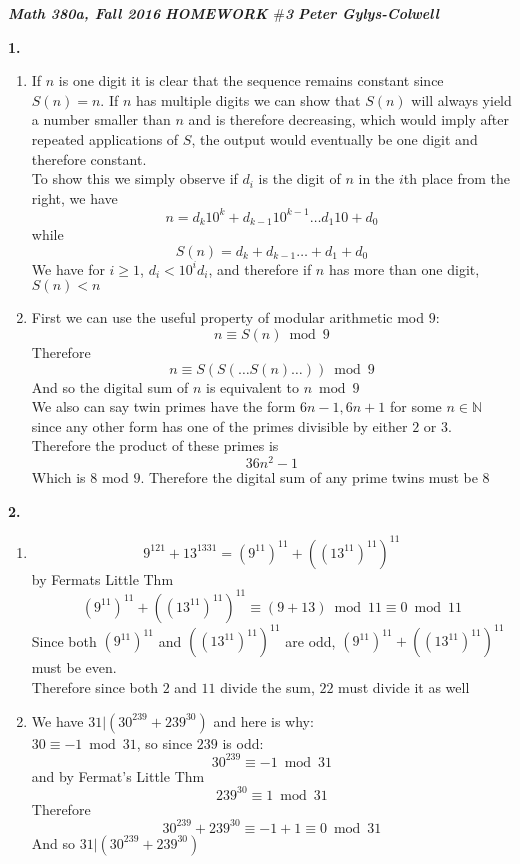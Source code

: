 \documentclass[12pt]{article}
\newenvironment{ques}{\vspace{2 ex}}{\vspace{2 ex}}
\theoremstyle{definition}
\begin{document}
\noindent \textit{\textbf{Math 380a, Fall 2016}} \hspace{1.3cm} \textit{\textbf{HOMEWORK $\#$3}} \hspace{1.3cm} \textit{\textbf{Peter Gylys-Colwell}} 

\vspace{1cm}

\begin{ques}
	\textbf{1.}
		\begin{enumerate}
			\item  If $n$ is one digit it is clear that the
				sequence remains constant since $S(n) = n$.  If
				$n$ has multiple digits we can show that $S(n)$
				will always yield a number smaller than $n$ and
				is therefore decreasing, which would imply
				after repeated applications of $S$, the output
				would eventually be one digit and therefore
				constant.\\ To show this we simply observe if
				$d_i$ is the digit of $n$ in the $i$th place
				from the right, we have 
				$$n = d_k10^k + d_{k-1}10^{k-1} \dots d_1 10 + d_0$$
				while 
				$$S(n) = d_k + d_{k-1} \dots + d_1 + d_0$$
				We have for $i \geq 1$, $d_i < 10^id_i$, and
				therefore if $n$ has more than one digit,
				$S(n) < n$
			\item First we can use the useful property of modular
				arithmetic mod $9$:
				$$n \equiv S(n) \bmod9$$
				Therefore
				$$n \equiv S(S(\dots S(n) \dots )) \bmod 9$$
				And so the digital sum of $n$ is equivalent to
				$n \bmod 9$\\ 
				We also can say twin primes have the form $6n -
				1, 6n + 1$ for some $n \in \mathbb{N}$ since any
				other form has one of the primes divisible by
				either $2$ or $3$.\\
				Therefore the product of these primes is 
				$$36n^2 -1$$
				Which is $8$ mod $9$. Therefore the digital sum
				of any prime twins must be $8$
		\end{enumerate}
\end{ques}

\begin{ques}
	\textbf{2.}
		\begin{enumerate}
			\item $$9^{121} + 13^{1331} = (9^{11})^{11} +
				((13^{11})^{11})^{11}$$ by Fermats Little Thm
				$$(9^{11})^{11} + ((13^{11})^{11})^{11} \equiv
				(9 + 13) \bmod{11} \equiv 0 \bmod{11}$$ Since
				both $(9^{11})^{11}$ and
				$((13^{11})^{11})^{11}$ are odd, $(9^{11})^{11}
				+ ((13^{11})^{11})^{11}$ must be even.\\
				Therefore since both $2$ and $11$ divide the
				sum, $22$ must divide it as well
			\item We have $31 |( 30^{239} + 239^{30})$ and here is why:\\
				$30 \equiv -1 \bmod 31$, so since $239$ is odd:
				$$30^{239} \equiv -1 \bmod 31$$
				and by Fermat's Little Thm 
				$$239^{30} \equiv 1 \bmod 31$$ 
				Therefore
				$$30^{239} + 239^{30} \equiv -1 + 1 \equiv 0 \bmod 31$$
				And so $31 |( 30^{239} + 239^{30})$
		\end{enumerate}
\end{ques}
\end{document}
